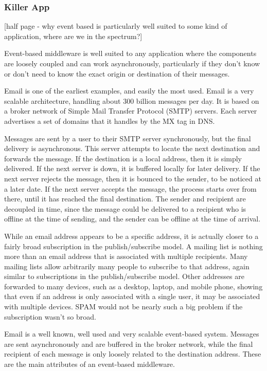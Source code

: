 \documentclass{acm_proc_article-sp}
\begin{document}

\subsubsection{Killer App}

[half page - why event based is particularly well suited to some kind of application, where are we in the spectrum?]

Event-based middleware is well suited to any application where the components are loosely coupled and can work asynchronously, particularly if they don't know or don't need to know the exact origin or destination of their messages.

Email is one of the earliest examples, and easily the most used. Email is a very scalable architecture, handling about 300 billion messages per day. It is based on a broker network of Simple Mail Transfer Protocol (SMTP) servers. Each server advertises a set of domains that it handles by the MX tag in DNS. 

Messages are sent by a user to their SMTP server synchronously, but the final delivery is asynchronous. This server attempts to locate the next destination and forwards the message. If the destination is a local address, then it is simply delivered. If the next server is down, it is buffered locally for later delivery. If the next server rejects the message, then it is bounced to the sender, to be noticed at a later date. If the next server accepts the message, the process starts over from there, until it has reached the final destination. The sender and recipient are decoupled in time, since the message could be delivered to a recipient who is offline at the time of sending, and the sender can be offline at the time of arrival.

While an email address appears to be a specific address, it is actually closer to a fairly broad subscription in the publish/subscribe model. A mailing list is nothing more than an email address that is associated with multiple recipients. Many mailing lists allow arbitrarily many people to subscribe to that address, again similar to subscriptions in the publish/subscribe model. Other addresses are forwarded to many devices, such as a desktop, laptop, and mobile phone, showing that even if an address is only associated with a single user, it may be associated with multiple devices. SPAM would not be nearly such a big problem if the subscription wasn't so broad.

Email is a well known, well used and very scalable event-based system. Messages are sent asynchronously and are buffered in the broker network, while the final recipient of each message is only loosely related to the destination address. These are the main attributes of an event-based middleware.
\end{document}
